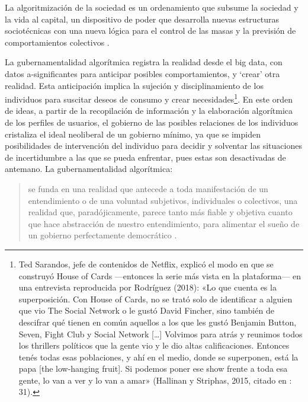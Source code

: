 \documentclass[
  spanish,
  11pt,
  a4paper,
]{scrbook}
\begin{document}
La algoritmización de la sociedad es un ordenamiento que subsume la
sociedad y la vida al capital, un dispositivo de poder que desarrolla
nuevas estructuras sociotécnicas con una nueva lógica para el control de
las masas y la previsión de comportamientos colectivos
\autocite[Pasquinelli, 2014: 99 en][31]{Rodriguez2018}.

La gubernamentalidad algorítmica registra la realidad desde el big data,
con datos a-significantes para anticipar posibles comportamientos, y
`crear' otra realidad. Esta anticipación implica la sujeción y
disciplinamiento de los individuos para suscitar deseos de consumo y
crear necesidades\footnote{Ted Sarandos, jefe de contenidos de Netflix,
  explicó el modo en que se construyó House of Cards ---entonces la
  serie más vista en la plataforma--- en una entrevista reproducida por
  Rodríguez (2018): «Lo que cuenta es la superposición. Con House of
  Cards, no se trató solo de identificar a alguien que vio The Social
  Network o le gustó David Fincher, sino también de descifrar qué tienen
  en común aquellos a los que les gustó Benjamin Button, Seven, Fight
  Club y Social Network {[}\ldots{]} Volvimos para atrás y reunimos
  todos los thrillers políticos que la gente vio y le dio altas
  calificaciones. Entonces tenés todas esas poblaciones, y ahí en el
  medio, donde se superponen, está la papa {[}the low-hanging fruit{]}.
  Si podemos poner ese show frente a toda esa gente, lo van a ver y lo
  van a amar» (Hallinan y Striphas, 2015, citado en
  \textcite{Rodriguez2018}: 31).}. En este orden de ideas, a partir de
la recopilación de información y la elaboración algorítmica de los
perfiles de usuarios, el gobierno de las posibles relaciones de los
individuos cristaliza el ideal neoliberal de un gobierno mínimo, ya que
se impiden posibilidades de intervención del individuo para decidir y
solventar las situaciones de incertidumbre a las que se pueda enfrentar,
pues estas son desactivadas de antemano. La gubernamentalidad
algorítmica:

\begin{quote}
se funda en una realidad que antecede a toda manifestación de un
entendimiento o de una voluntad subjetivos, individuales o colectivos,
una realidad que, paradójicamente, parece tanto más fiable y objetiva
cuanto que hace abstracción de nuestro entendimiento, para alimentar el
sueño de un gobierno perfectamente democrático
\autocite[106]{Rouvroy2016}.
\end{quote}
\end{document}
